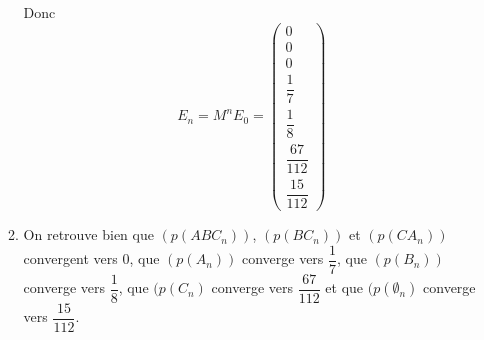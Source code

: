 \begin{enumerate}
\begin{enumerate}
Donc $$E_n=M^nE_0=\left(\begin{array}{c}
0\\
0\\
0\\
\dfrac 1{7}\\
\dfrac 18\\
\dfrac {67}{112}\\
\dfrac {15}{112}
\end{array}\right)$$
\item On retrouve bien que $(p(ABC_n))$, $(p(BC_n))$ et $(p(CA_n))$ convergent vers $0$, que $(p(A_n))$ converge vers $\dfrac 1{7}$, que $(p(B_n))$ converge vers $\dfrac 18$, que $(p(C_n)$ converge vers $\dfrac {67}{112}$ et que $(p(\emptyset_n)$ converge vers $\dfrac {15}{112}$.
\end{enumerate}
\end{enumerate} 



